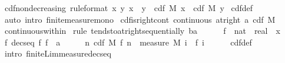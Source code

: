 \documentclass[leqno]{article}
\theoremstyle{definition}
\begin{document}
\begin{isabellebody}
\isamarkupfalse%
\ cdf{\isacharunderscore}nondecreasing\ {\isacharbrackleft}rule{\isacharunderscore}format{\isacharbrackright}{\isacharcolon}\ {\isachardoublequoteopen}{\isacharparenleft}{\isasymforall}x\ y{\isachardot}\ x\ {\isasymle}\ y\ {\isasymlongrightarrow}\ cdf\ M\ x\ {\isasymle}\ cdf\ M\ y{\isacharparenright}{\isachardoublequoteclose}\isanewline
{}\isamarkupfalse%
\ cdf{\isacharunderscore}def\ \isamarkupfalse%
\ {\isacharparenleft}auto\ intro{\isacharbang}{\isacharcolon}\ finite{\isacharunderscore}measure{\isacharunderscore}mono{\isacharparenright}%
\isanewline\isanewline%
\isamarkupfalse%
\ cdf{\isacharunderscore}is{\isacharunderscore}right{\isacharunderscore}cont{\isacharcolon}\ {\isachardoublequoteopen}continuous\ {\isacharparenleft}at{\isacharunderscore}right\ a{\isacharparenright}\ {\isacharparenleft}cdf\ M{\isacharparenright}{\isachardoublequoteclose}\isanewline
{}\isamarkupfalse%
\ continuous{\isacharunderscore}within\isanewline
{}\isamarkupfalse%
\ {\isacharparenleft}rule\ tendsto{\isacharunderscore}at{\isacharunderscore}right{\isacharunderscore}sequentially{\isacharbrackleft}\ b{\isacharequal}{\isachardoublequoteopen}a\ {\isacharplus}\ {}{\isachardoublequoteclose}{\isacharbrackright}{\isacharparenright}\isanewline
\ \ \isamarkupfalse%
\ f\ {\isacharcolon}{\isacharcolon}\ {\isachardoublequoteopen}nat\ {\isasymRightarrow}\ real{\isachardoublequoteclose}\ \ x\ \isamarkupfalse%
\ f{\isacharcolon}\ {\isachardoublequoteopen}decseq\ f{\isachardoublequoteclose}\ {\isachardoublequoteopen}f\ {\isacharminus}{\isacharminus}{\isacharminus}{\isacharminus}{\isachargreater}\ a{\isachardoublequoteclose}\isanewline
\ \ \isamarkupfalse%
\ \isamarkupfalse%
\ {\isachardoublequoteopen}{\isacharparenleft}{\isasymlambda}n{\isachardot}\ cdf\ M\ {\isacharparenleft}f\ n{\isacharparenright}{\isacharparenright}\ {\isacharminus}{\isacharminus}{\isacharminus}{\isacharminus}{\isachargreater}\ measure\ M\ {\isacharparenleft}{\isasymInter}i{\isachardot}\ {\isacharbraceleft}{\isachardot}{\isachardot}\ f\ i{\isacharbraceright}{\isacharparenright}{\isachardoublequoteclose}\isanewline
\ \ \ \ \isamarkupfalse%
\ cdf{\isacharunderscore}def\ \isanewline
\ \ \ \ \isamarkupfalse%
\ {\isacharparenleft}intro\ finite{\isacharunderscore}Lim{\isacharunderscore}measure{\isacharunderscore}decseq{\isacharparenright}\isanewline

\end{isabellebody}
\end{document}
